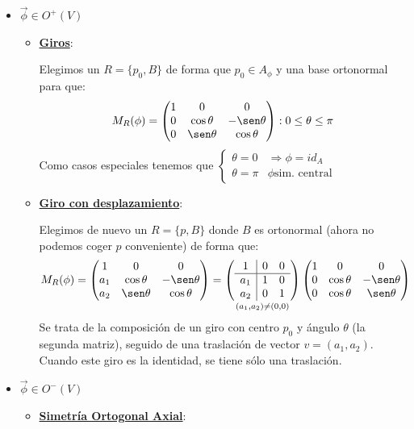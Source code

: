 \documentclass[10pt,a4paper,openright]{book}
\theoremstyle{break}
\begin{document}
\begin{itemize}
\item $\vec{\phi} \in O^+(V)$
	\begin{itemize}
	\item \underline{\textbf{Giros}}: 
	
	Elegimos un $R=\{p_0, B\}$ de forma que $p_0\in A_\phi$ y una base ortonormal para que:
	$$M_R (\phi) = \begin{pmatrix} 1 & 0 & 0 \\ 0 & \cos\theta & -\sen\theta \\ 0 & \sen\theta & \cos\theta \\ \end{pmatrix} : 0 \leq \theta \leq \pi$$
 	Como casos especiales tenemos que $\begin{cases} \theta = 0  & \Rightarrow \phi = id_A  \\ \theta = \pi & \phi \mbox{sim. central}\end{cases}$

	\item \underline{\textbf{Giro con desplazamiento}}: 
	
	Elegimos de nuevo un $R=\{p, B\}$ donde $B$ es ortonormal (ahora no podemos coger $p$ conveniente) de forma que:
	$$M_R (\phi) = \begin{pmatrix} 1 & 0 & 0 \\ a_1 & \cos\theta & -\sen\theta \\ a_2 & \sen\theta & \cos\theta \\ \end{pmatrix} = \underset{(a_1, a_2) \neq (0,0)}{\left(\begin{array}{c|cc} 1 & 0  & 0  \\ \hline a_1 & 1 & 0 \\ a_2 & 0 & 1 \\ \end{array} \right) } \begin{pmatrix} 1 & 0 & 0 \\ 0 & \cos\theta & -\sen\theta \\ 0 & \cos\theta & \sen\theta \\ \end{pmatrix} $$	
	Se trata de la composición de un giro con centro $p_0$ y ángulo $\theta$ (la segunda matriz), seguido de una traslación de vector $v = (a_1,a_2)$. Cuando este giro es la identidad, se tiene sólo una traslación.

	\end{itemize}
\item $\vec{\phi} \in O^-(V)$
	\begin{itemize}
	\item \underline{\textbf{Simetría Ortogonal Axial}}: 
	

\end{itemize}
\end{itemize}
\end{document}
